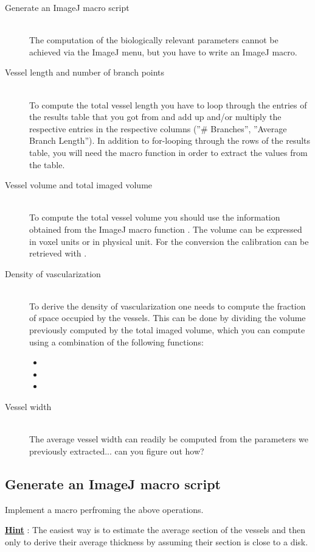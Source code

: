 \begin{description}
\item[Generate an ImageJ macro script]\hfill\\
The computation of the biologically relevant parameters cannot be achieved via the ImageJ menu, but you have to write an ImageJ macro.
\item[Vessel length and number of branch points]\hfill\\
To compute the total vessel length you have to loop through the entries of the results table that you got from  and add up and/or multiply the respective entries in the respective columns (''\# Branches'', ''Average Branch Length''). In addition to for-looping through the rows of the results table, you will need the  macro function in order to extract the values from the table.
\item[Vessel volume and total imaged volume]\hfill\\
To compute the total vessel volume you should use the information obtained from the ImageJ macro function . The volume can be expressed in voxel units or in physical unit. For the conversion the calibration can be retrieved with .

\item[Density of vascularization]\hfill\\
To derive the density of vascularization one needs to compute the fraction of space occupied by the vessels. This can be done by dividing the volume previously computed by the total imaged volume, which you can compute using a combination of the following functions:
\begin{itemize}
\item {}
\item {}
\item {}
\end{itemize}
\item[Vessel width]\hfill\\
The average vessel width can readily be computed from the parameters we previously extracted... can you figure out how?

\end{description}

\subsection{Generate an ImageJ macro script}

Implement a macro perfroming the above operations.

\textbf{\underline{Hint}} : The easiest way is to estimate the average section of the vessels and then only to derive their average thickness by assuming their section is close to a disk.


